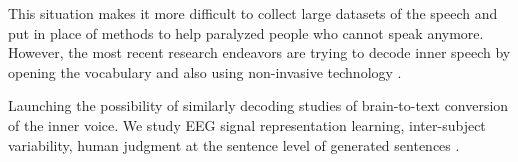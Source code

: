 This situation makes it more difficult to collect large datasets of the speech and put in place of methods to help paralyzed people who cannot speak anymore. However, the most recent research endeavors are trying to decode inner speech by opening the vocabulary and also using non-invasive technology \cite{Defossez2023, Nieto2022}.

Launching the possibility of similarly decoding studies of brain-to-text conversion of the inner voice. We study EEG signal representation learning, inter-subject variability, human judgment at the sentence level of generated sentences \cite{Wang2022}.
